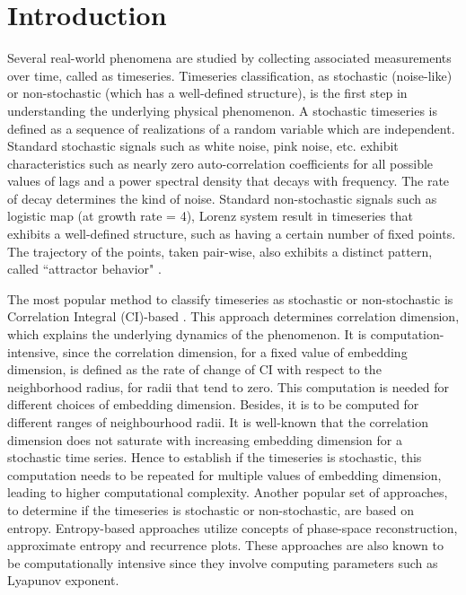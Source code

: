 \documentclass[journal]{IEEEtran}
\begin{document}
	\section{Introduction}
	Several real-world phenomena are studied by collecting associated measurements over time, called as timeseries. Timeseries classification, as stochastic (noise-like) or non-stochastic (which has a well-defined structure), is the first step in understanding the underlying physical phenomenon. A stochastic timeseries is defined as a sequence of realizations of a random variable which are independent. Standard stochastic signals such as white noise, pink noise, etc. exhibit characteristics such as nearly zero auto-correlation coefficients for all possible values of lags and a power spectral density that decays with frequency. The rate of decay determines the kind of noise.  Standard non-stochastic signals such as logistic map (at growth rate = 4), Lorenz system result in timeseries that exhibits a well-defined structure, such as having a certain number of fixed points. The trajectory of the points, taken pair-wise, also exhibits a distinct pattern, called ``attractor behavior" \cite{CIGRacia}.
	
	
	The most popular method to classify timeseries as stochastic or non-stochastic is Correlation Integral (CI)-based \cite{CIGRacia}. This approach determines correlation dimension, which explains the underlying dynamics of the phenomenon. It is computation-intensive, since the correlation dimension, for a fixed value of embedding dimension, is defined as the rate of change of CI with respect to the neighborhood radius, for radii that tend to zero. This computation is needed for different choices of embedding dimension. Besides, it is to be computed for  different ranges of neighbourhood radii. It is well-known that the correlation dimension does not saturate with increasing embedding dimension for a stochastic time series. Hence to establish if the timeseries is stochastic, this computation needs to be repeated for multiple values of embedding dimension, leading to higher computational complexity. Another popular set of approaches, to determine if the timeseries is stochastic or non-stochastic, are based on entropy. Entropy-based approaches \cite{splrecent, russian, Boaretto2021} utilize concepts of phase-space reconstruction, approximate entropy and recurrence plots. These approaches are also known to be computationally intensive since they involve computing parameters such as Lyapunov exponent.
	
\end{document}
